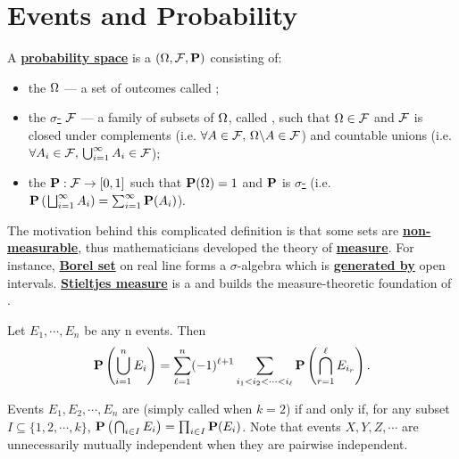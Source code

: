 \documentclass[main.tex]{subfiles}
\begin{document}
\minispacing

\section{Events and Probability}

A \href{https://en.wikipedia.org/wiki/Probability_space}{\bf probability space} is a  $(\Omega,\mathcal{F},\mathbf{P})$ consisting of:

\begin{itemize}
	\item the  $\Omega$ --- a set of outcomes called ;
	\item the \href{https://en.wikipedia.org/wiki/%CE%A3-algebra}{$\sigma$-\tb{algebra}} $\mathcal{F}$ --- a family of subsets of $\Omega$, called \tb{events}, such that $\Omega \in \mathcal{F}$ and $\mathcal{F}$ is closed under complements (i.e. $\forall A \in \mathcal{F},\, \Omega \backslash A \in \mathcal{F}$) and countable unions (i.e. $\forall  A_i \in \mathcal{F},\, \bigcup_{i=1}^{\infty} A_i \in \mathcal{F}$);
	\item the  $\mathbf{P}: \mathcal{F} \rightarrow [0,1]$ such that $\mathbf{P}(\Omega)=1$ and $\mathbf{P}$ is \href{https://en.wikipedia.org/wiki/Sigma-additive_set_function}{$\sigma$-} (i.e. $\mathbf{P}\left(\;\!\bigsqcup_{i=1}^{\infty} A_i\right) = \sum_{i=1}^{\infty} \mathbf{P}(A_i)$).
\end{itemize}

The motivation behind this complicated definition is that some sets are \href{https://en.wikipedia.org/wiki/Non-measurable_set}{\bf non-measurable}, thus mathematicians developed the theory of \href{https://en.wikipedia.org/wiki/Measure_(mathematics)}{\bf measure}. For instance, \href{https://en.wikipedia.org/wiki/Borel_set}{\bf Borel set} on real line forms a $\sigma$-algebra which is \href{https://en.wikipedia.org/wiki/Carathéodory%27s_extension_theorem}{\bf generated by} open intervals. \href{https://en.wikipedia.org/wiki/Lebesgue–Stieltjes_integration}{\bf Stieltjes measure} is a \tb{Borel measure} and builds the measure-theoretic foundation of \tb{continuous probability distribution}.

\begin{lemma}
	Let $E_1,\cdots,E_n$ be any n events. Then
	\[
		\mathbf{P}\left(\bigcup_{i=1}^{n}E_i\right) = \sum_{\ell=1}^{n} (-1)^{\ell + 1} \sum_{i_1 < i_2 < \cdots < i_\ell} \mathbf{P} \left(\bigcap_{r=1}^{\ell}E_{i_r}\right).
	\]
\end{lemma}

Events $E_1,E_2,\cdots,E_n$ are  (simply called  when $k=2$) if and only if, for any subset $I \subseteq \{1,2,\cdots,k\}$,
$\mathbf{P}\left(\;\!\bigcap_{i\in I}E_i\right)=\prod_{i\in I}\mathbf{P}(E_i)$. Note that events $X,Y,Z,\cdots$ are unnecessarily mutually independent when they are pairwise independent.
\end{document}

